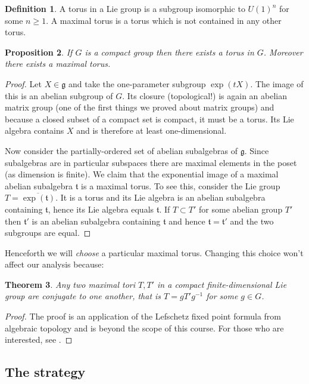 \documentclass[12pt]{article}
\newtheorem{thm}{Theorem}[section]
\newtheorem{prp}[thm]{Proposition}
\theoremstyle{definition}
\newtheorem{dfn}[thm]{Definition}
\theoremstyle{check}
\theoremstyle{remark}
\theoremstyle{TheoremNum}
\begin{document}
\begin{dfn}
A torus in a Lie group is a subgroup isomorphic to $U(1)^n$ for some $n\geq 1$. A maximal torus is a torus which is not contained in any other torus.
\end{dfn}
\begin{prp}
If $G$ is a compact group then there exists a torus in $G$. Moreover there exists a maximal torus.
\end{prp}
\begin{proof}
Let $X\in\mathfrak{g}$ and take the one-parameter subgroup $\exp(tX)$. The image of this is an abelian subgroup of $G$. Its closure (topological!) is again an abelian matrix group (one of the first things we proved about matrix groups) and because a closed subset of a compact set is compact, it must be a torus. Its Lie algebra contains $X$ and is therefore at least one-dimensional.

Now consider the partially-ordered set of abelian subalgebras of $\mathfrak{g}$. Since subalgebras are in particular subspaces there are maximal elements in the poset (as dimension is finite). We claim that the exponential image of a maximal abelian subalgebra $\mathfrak{t}$ is a maximal torus. To see this, consider the Lie group $T=\overline{\exp(\mathfrak{t})}$. It is a torus and its Lie algebra is an abelian subalgebra containing $\mathfrak{t}$, hence its Lie algebra equals $\mathfrak{t}$. If $T\subset T'$ for some abelian group $T'$ then $\mathfrak{t}'$ is an abelian subalgebra containing $\mathfrak{t}$ and hence $\mathfrak{t}=\mathfrak{t'}$ and the two subgroups are equal.
\end{proof}

Henceforth we will {\em choose} a particular maximal torus. Changing this choice won't affect our analysis because:

\begin{thm}
Any two maximal tori $T,T'$ in a compact finite-dimensional Lie group are conjugate to one another, that is $T=gT'g^{-1}$ for some $g\in G$.
\end{thm}
\begin{proof}
The proof is an application of the Lefschetz fixed point formula from algebraic topology and is beyond the scope of this course. For those who are interested, see {\cite[4.21--4.23]{Adams}}.
\end{proof}

\subsection{The strategy}
\end{document}
